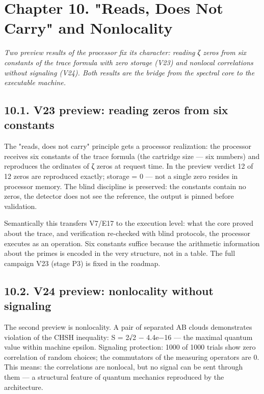 \documentclass[11pt,a4paper]{article}
\begin{document}
\section{Chapter 10. "Reads, Does Not Carry" and Nonlocality}

\noindent\textit{\color{copper}Two preview results of the processor fix its character: reading ζ zeros from six constants of the trace formula with zero storage (V23) and nonlocal correlations without signaling (V24). Both results are the bridge from the spectral core to the executable machine.}

\subsection{10.1. V23 preview: reading zeros from six constants}

The "reads, does not carry" principle gets a processor realization: the processor receives six constants of the trace formula (the cartridge size — six numbers) and reproduces the ordinates of ζ zeros at request time. In the preview verdict 12 of 12 zeros are reproduced exactly; storage = 0 — not a single zero resides in processor memory. The blind discipline is preserved: the constants contain no zeros, the detector does not see the reference, the output is pinned before validation.

Semantically this transfers V7/E17 to the execution level: what the core proved about the trace, and verification re-checked with blind protocols, the processor executes as an operation. Six constants suffice because the arithmetic information about the primes is encoded in the very structure, not in a table. The full campaign V23 (stage P3) is fixed in the roadmap.

\subsection{10.2. V24 preview: nonlocality without signaling}

The second preview is nonlocality. A pair of separated AB clouds demonstrates violation of the CHSH inequality: S = 2√2 − 4.4e−16 — the maximal quantum value within machine epsilon. Signaling protection: 1000 of 1000 trials show zero correlation of random choices; the commutators of the measuring operators are 0. This means: the correlations are nonlocal, but no signal can be sent through them — a structural feature of quantum mechanics reproduced by the architecture.

\begin{center}\end{center}
\end{document}

